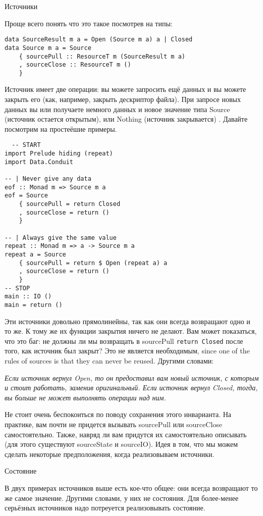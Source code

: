 Источники

Проще всего понять что это такое посмотрев  на типы:
\begin{lstlisting}
data SourceResult m a = Open (Source m a) a | Closed
data Source m a = Source
    { sourcePull :: ResourceT m (SourceResult m a)
    , sourceClose :: ResourceT m ()
    }
\end{lstlisting}
Источник имеет две операции: вы можете запросить ещё данных и вы можете закрыть его (как,
например, закрыть дескриптор файла). При запросе новых данных вы или получаете немного
данных и новое  значение типа Source (источник остается открытым), или Nothing (источник
закрывается) . Давайте посмотрим на простеёшие примеры.
\begin{lstlisting}
  -- START
import Prelude hiding (repeat)
import Data.Conduit

-- | Never give any data
eof :: Monad m => Source m a
eof = Source
    { sourcePull = return Closed
    , sourceClose = return ()
    }

-- | Always give the same value
repeat :: Monad m => a -> Source m a
repeat a = Source
    { sourcePull = return $ Open (repeat a) a
    , sourceClose = return ()
    }
-- STOP
main :: IO ()
main = return ()
\end{lstlisting}
Эти источники довольно прямолинейны, так как они всегда возвращают одно и то же. К тому
же их функции закрытия ничего не делают. Вам может показаться, что это баг: не должны ли 
мы возвращать в sourcePull \verb=return Closed= после того, как источник был закрыт? Это
не является необходимым, since one of the rules of sources is
that they can never be
reused. Другими словами:

    
\textit{Если источник вернул Open, то он предоставил вам новый источник, с которым и
стоит работать, заменив оригинальный. Если источник вернул Closed, тогда, вы больше не
может выполнять операции над ним.}
    
Не стоит очень беспокоиться по поводу сохранения этого инварианта. На практике, вам почти
не придется вызывать sourcePull или sourceClose самостоятельно. Также, навряд ли вам
придутся их самостоятельно описывать (для этого существуют sourceState и sourceIO).
Идея в том, что мы можем сделать некоторые предположения, когда реализовываем источники. 
 

Состояние

В двух примерах источников выше есть кое-что общее: они всегда возвращают то же самое
значение. Другими словами, у них не состояния. Для более-менее серьёзных источников надо
потреуется реализовывать состояние.

